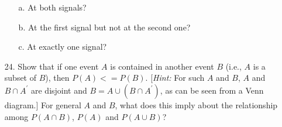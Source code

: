 \documentclass[letterpaper,12pt]{article}
\begin{document}
\begin{enumerate}
  \begin{enumerate}
      \item[a.]
        At both signals?
      \item[b.]
        At the first signal but not at the second one?
      \item[c.]
        At exactly one signal?
    \end{enumerate}
  \item[24.]
    Show that if one event $A$ is contained in another event $B$ (i.e., $A$ is a subset of $B$), then $P(A) <= P(B)$. [\textit{Hint:} For such $A$ and $B$, $A$ and $B \cap A^\prime$ are disjoint and $B = A \cup (B \cap A^\prime)$, as can be seen from a Venn diagram.] For general $A$ and $B$, what does this imply about the relationship among $P(A \cap B)$, $P(A)$ and $P(A \cup B)$?
\end{enumerate}
\end{document}
